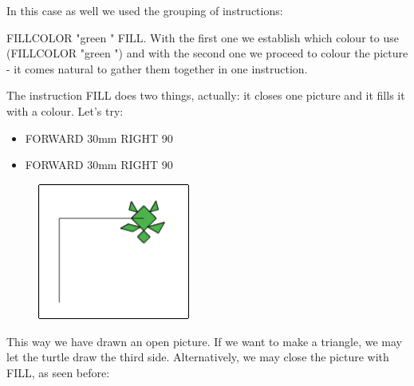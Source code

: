 \vskip 1cm

In this case as well we used the grouping of instructions:

FILLCOLOR  "green " FILL. With the first one we establish which colour to use
(FILLCOLOR  "green ") and with the second one we proceed to colour the picture - it comes natural to gather them together in one instruction.

The instruction FILL does two things, actually: it closes one picture and it fills it with a colour. 
Let's try:


\vskip 1cm

\begin{scriptsize}
\begin{minipage}{0.40\textwidth}
\begin{itemize}[itemsep=-3pt,parsep=2pt]
\item[] FORWARD 30mm RIGHT 90
\item[] FORWARD 30mm RIGHT 90
\end{itemize}
\end{minipage}
\end{scriptsize}
\begin{minipage}{0.4\textwidth}
\begin{figure}[H]
   \includegraphics[width=5.0cm,trim=4 4 8 4,clip]{./images/disegnare/disegnare-12.png}
   \label{dis-12}
\end{figure}
\end{minipage} \hfill

\vskip 1cm

This way we have drawn an open picture. If we want to make a triangle, we may let the turtle draw the third side. Alternatively, we may close the picture with FILL, as seen before:

\vskip 1cm

